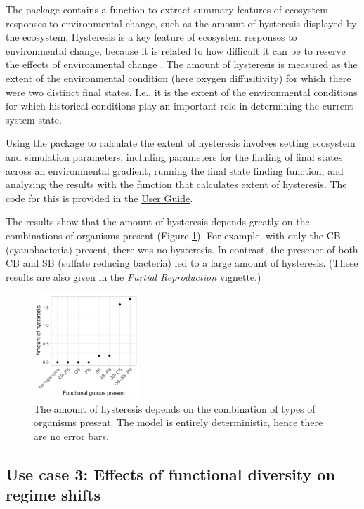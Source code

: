\documentclass[]{elsarticle} %
\begin{document}
The package contains a function to extract summary features of ecosystem responses to environmental change, such as the amount of hysteresis displayed by the ecosystem. Hysteresis is a key feature of ecosystem responses to environmental change, because it is related to how difficult it can be to reserve the effects of environmental change \citep{Scheffer2001}. The amount of hysteresis is measured as the extent of the environmental condition (here oxygen diffusitivity) for which there were two distinct final states. I.e., it is the extent of the environmental conditions for which historical conditions play an important role in determining the current system state.

Using the package to calculate the extent of hysteresis involves setting ecosystem and simulation parameters, including parameters for the finding of final states across an environmental gradient, running the final state finding function, and analysing the results with the function that calculates extent of hysteresis. The code for this is provided in the \href{https://uzh-peg.r-universe.dev/articles/microxanox/User-guide.html}{User Guide}.

The results show that the amount of hysteresis depends greatly on the combinations of organisms present (Figure \ref{fig:uc2}). For example, with only the CB (cyanobacteria) present, there was no hysteresis. In contrast, the presence of both CB and SB (sulfate reducing bacteria) led to a large amount of hysteresis. (These results are also given in the \emph{Partial Reproduction} vignette.)

\begin{figure}

{\centering \includegraphics[width=150px]{./figures/gen_uc2_user_guide_hysteresis} 

}

\caption{The amount of hysteresis depends on the combination of types of organisms present. The model is entirely deterministic, hence there are no error bars.}\label{fig:uc2}
\end{figure}

\subsection{Use case 3: Effects of functional diversity on regime shifts}\label{use-case-3-effects-of-functional-diversity-on-regime-shifts}
\end{document}
